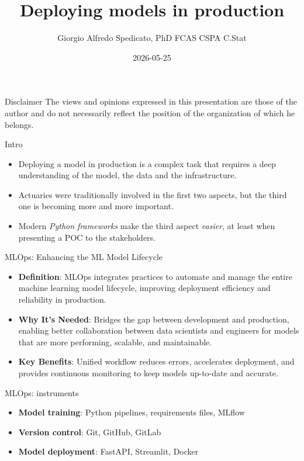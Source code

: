 \documentclass[
  ignorenonframetext,
]{beamer}
\title{Deploying models in production}
\author{Giorgio Alfredo Spedicato, PhD FCAS CSPA C.Stat\inst{1}}
\date{2026-05-25}
\institute{Leitha SRL, Unipol Group}
\providecommand{\tightlist}{%
  \setlength{\itemsep}{0pt}\setlength{\parskip}{0pt}}
\begin{document}
\frame{\titlepage}


\begin{frame}{Disclaimer}
\label{disclaimer}
The views and opinions expressed in this presentation are those of the
author and do not necessarily reflect the position of the organization
of which he belongs.
\end{frame}

\begin{frame}{Intro}
\label{intro}
\begin{itemize}
\tightlist
\item
  Deploying a model in production is a complex task that requires a deep
  understanding of the model, the data and the infrastructure.
\item
  Actuaries were traditionally involved in the first two aspects, but
  the third one is becoming more and more important.
\item
  Modern \emph{Python frameworks} make the third aspect \emph{easier},
  at least when presenting a POC to the stakeholders.
\end{itemize}
\end{frame}

\begin{frame}
\begin{block}{MLOps: Enhancing the ML Model Lifecycle}
\label{mlops-enhancing-the-ml-model-lifecycle}
\begin{itemize}
\item
  \textbf{Definition}: MLOps integrates practices to automate and manage
  the entire machine learning model lifecycle, improving deployment
  efficiency and reliability in production.
\item
  \textbf{Why It's Needed}: Bridges the gap between development and
  production, enabling better collaboration between data scientists and
  engineers for models that are more performing, scalable, and
  maintainable.
\item
  \textbf{Key Benefits}: Unified workflow reduces errors, accelerates
  deployment, and provides continuous monitoring to keep models
  up-to-date and accurate.
\end{itemize}
\end{block}
\end{frame}

\begin{frame}
\begin{block}{MLOps: instruments}
\label{mlops-instruments}
\begin{itemize}
\tightlist
\item
  \textbf{Model training}: Python pipelines, requirements files, MLflow
\item
  \textbf{Version control}: Git, GitHub, GitLab
\item
  \textbf{Model deployment}: FastAPI, Streamlit, Docker
\end{itemize}
\end{block}
\end{frame}
\end{document}
